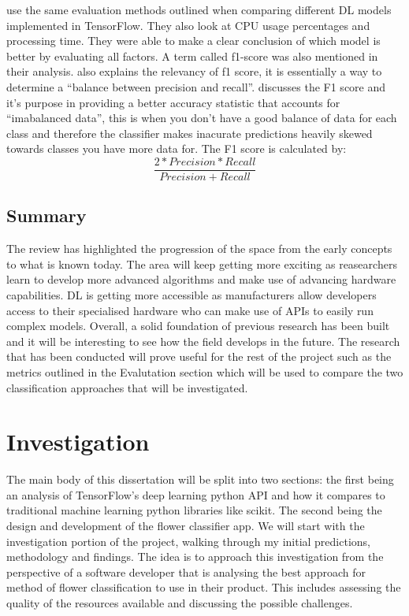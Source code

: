\documentclass[12pt,a4paper]{report}
\begin{document}
\citet{Chockwanich} use the same evaluation methods outlined when comparing different DL models 
implemented in TensorFlow. They also look at CPU usage percentages and processing time. They were able to make a clear 
conclusion of which model is better by evaluating all factors. A term called f1-score was also mentioned in their 
analysis. \citet{shung2018} also explains the relevancy of f1 score, it is essentially a way to determine a “balance between
precision and recall”. \citet{kors2021} discusses the F1 score and it's purpose in providing a better 
accuracy statistic that accounts for “imabalanced data”, this is when you don't have a good balance of data for each 
class and therefore the classifier makes inacurate predictions heavily skewed towards classes you have more data for. 
The F1 score is calculated by:
\[\frac{2*Precision*Recall}{Precision + Recall}\]

\section{Summary}

The review has highlighted the progression of the space from the early concepts to what is known today. 
The area will keep getting more exciting as reasearchers learn to develop more advanced
algorithms and make use of advancing hardware capabilities. DL is getting more
accessible as manufacturers allow developers access to their specialised hardware who can make use of APIs to easily
run complex models. Overall, a solid foundation of previous research has been built and it will be interesting 
to see how the field develops in the future. The research that has been conducted will prove useful for the rest of the 
project such as the metrics outlined in the Evalutation section which will be used to compare the 
two classification approaches that will be investigated.

\clearpage

\chapter{Investigation}

The main body of this dissertation will be split into two sections: the first being an analysis of TensorFlow's deep 
learning python API and how it compares to traditional machine learning python libraries like scikit. The second being 
the design and development of the flower classifier app. We will start with the investigation portion of the project,
walking through my initial predictions, methodology and findings. The idea is to approach this investigation from the 
perspective of a software developer that is analysing the best approach for method of flower classification to use in 
their product. This includes assessing the quality of the resources available and discussing the possible challenges.
\end{document}
